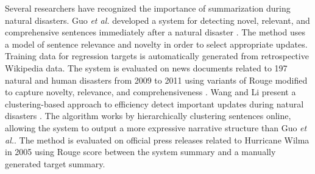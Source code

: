 Several researchers have recognized the importance of summarization during
natural disasters.  Guo \textit{et al.} developed a system for detecting
novel, relevant, and comprehensive sentences immediately after a natural
disaster \cite{qi:temporal-summarization}.  The method uses a model of
sentence relevance and novelty in order to select appropriate updates.
Training data for regression targets is automatically generated from
retrospective Wikipedia data.  The system is evaluated on news documents
related to 197 natural and human disasters from 2009 to 2011 using variants of
Rouge modified to capture novelty, relevance, and comprehensiveness
\cite{lin2004rouge}.  Wang and Li present a clustering-based approach to
efficiency detect important updates during natural disasters
\cite{wang:update-summarization}.  The algorithm works by hierarchically
clustering sentences online, allowing the system to output a more expressive
narrative structure than Guo \textit{et al.}.  The method is evaluated on
official press releases related to Hurricane Wilma  in 2005 using Rouge score
between the system summary and a manually generated target summary.

